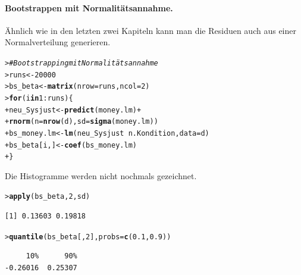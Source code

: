 \documentclass[oneside, 10pt]{book}\usepackage[]{graphicx}\usepackage[]{xcolor}
\makeatletter
\newcommand{\hlnum}[1]{\textcolor[rgb]{0.686,0.059,0.569}{#1}}%
\newcommand{\hlcom}[1]{\textcolor[rgb]{0.678,0.584,0.686}{\textit{#1}}}%
\newcommand{\hlopt}[1]{\textcolor[rgb]{0,0,0}{#1}}%
\newcommand{\hlstd}[1]{\textcolor[rgb]{0.345,0.345,0.345}{#1}}%
\newcommand{\hlkwa}[1]{\textcolor[rgb]{0.161,0.373,0.58}{\textbf{#1}}}%
\newcommand{\hlkwb}[1]{\textcolor[rgb]{0.69,0.353,0.396}{#1}}%
\newcommand{\hlkwc}[1]{\textcolor[rgb]{0.333,0.667,0.333}{#1}}%
\newcommand{\hlkwd}[1]{\textcolor[rgb]{0.737,0.353,0.396}{\textbf{#1}}}%
\newenvironment{kframe}{%
 \def\at@end@of@kframe{}%
 \ifinner\ifhmode%
  \def\at@end@of@kframe{\end{minipage}}%
  \begin{minipage}{\columnwidth}%
 \fi\fi%
 \def\FrameCommand##1{\hskip\@totalleftmargin \hskip-\fboxsep
 \colorbox{shadecolor}{##1}\hskip-\fboxsep
     \hskip-\linewidth \hskip-\@totalleftmargin \hskip\columnwidth}%
 \MakeFramed {\advance\hsize-\width
   \@totalleftmargin\z@ \linewidth\hsize
   \@setminipage}}%
 {\par\unskip\endMakeFramed%
 \at@end@of@kframe}
\newenvironment{knitrout}{}{} %
\makeatother
\begin{document}
\paragraph{Bootstrappen mit Normalitätsannahme.}
Ähnlich
wie in den letzten zwei Kapiteln kann man die Residuen
auch aus einer Normalverteilung generieren.
\begin{knitrout}
\color{fgcolor}\begin{kframe}
\begin{alltt}
\hlstd{> }\hlcom{# Bootstrapping mit Normalitätsannahme}
\hlstd{> }\hlstd{runs} \hlkwb{<-} \hlnum{20000}
\hlstd{> }\hlstd{bs_beta} \hlkwb{<-} \hlkwd{matrix}\hlstd{(}\hlkwc{nrow} \hlstd{= runs,} \hlkwc{ncol} \hlstd{=} \hlnum{2}\hlstd{)}
\hlstd{> }\hlkwa{for} \hlstd{(i} \hlkwa{in} \hlnum{1}\hlopt{:}\hlstd{runs) \{}
\hlstd{+ }  \hlstd{neu_Sysjust} \hlkwb{<-} \hlkwd{predict}\hlstd{(money.lm)} \hlopt{+}
\hlstd{+ }    \hlkwd{rnorm}\hlstd{(}\hlkwc{n} \hlstd{=} \hlkwd{nrow}\hlstd{(d),} \hlkwc{sd} \hlstd{=} \hlkwd{sigma}\hlstd{(money.lm))}
\hlstd{+ }  \hlstd{bs_money.lm} \hlkwb{<-} \hlkwd{lm}\hlstd{(neu_Sysjust} \hlopt{~} \hlstd{n.Kondition,} \hlkwc{data} \hlstd{= d)}
\hlstd{+ }  \hlstd{bs_beta[i, ]} \hlkwb{<-} \hlkwd{coef}\hlstd{(bs_money.lm)}
\hlstd{+ }\hlstd{\}}
\end{alltt}
\end{kframe}
\end{knitrout}
Die Histogramme werden nicht nochmals gezeichnet.
\begin{knitrout}
\color{fgcolor}\begin{kframe}
\begin{alltt}
\hlstd{> }\hlkwd{apply}\hlstd{(bs_beta,} \hlnum{2}\hlstd{, sd)}
\end{alltt}
\begin{verbatim}
[1] 0.13603 0.19818
\end{verbatim}
\begin{alltt}
\hlstd{> }\hlkwd{quantile}\hlstd{(bs_beta[,} \hlnum{2}\hlstd{],} \hlkwc{probs} \hlstd{=} \hlkwd{c}\hlstd{(}\hlnum{0.1}\hlstd{,} \hlnum{0.9}\hlstd{))}
\end{alltt}
\begin{verbatim}
     10%      90% 
-0.26016  0.25307 
\end{verbatim}
\end{kframe}
\end{knitrout}
\end{document}
